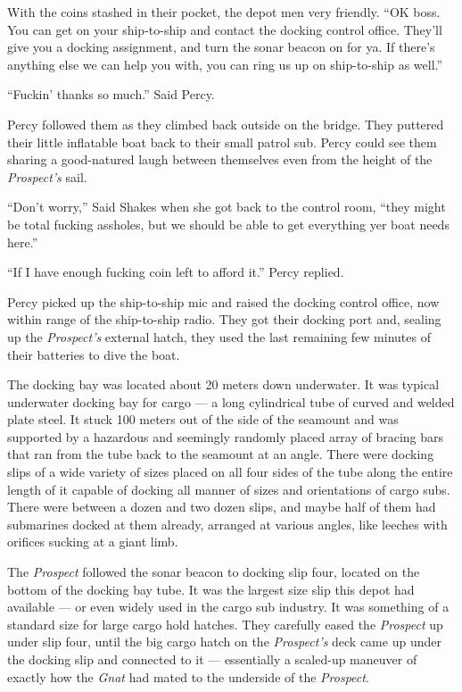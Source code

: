 \documentclass[
]{scrbook}
\begin{document}
With the coins stashed in their pocket, the depot men very friendly.
``OK boss. You can get on your ship-to-ship and contact the docking
control office. They'll give you a docking assignment, and turn the
sonar beacon on for ya. If there's anything else we can help you with,
you can ring us up on ship-to-ship as well.''

``Fuckin' thanks so much.'' Said Percy.

Percy followed them as they climbed back outside on the bridge. They
puttered their little inflatable boat back to their small patrol sub.
Percy could see them sharing a good-natured laugh between themselves
even from the height of the \emph{Prospect's} sail.

``Don't worry,'' Said Shakes when she got back to the control room,
``they might be total fucking assholes, but we should be able to get
everything yer boat needs here.''

``If I have enough fucking coin left to afford it.'' Percy replied.

Percy picked up the ship-to-ship mic and raised the docking control
office, now within range of the ship-to-ship radio. They got their
docking port and, sealing up the \emph{Prospect's} external hatch, they
used the last remaining few minutes of their batteries to dive the boat.

The docking bay was located about 20 meters down underwater. It was
typical underwater docking bay for cargo --- a long cylindrical tube of
curved and welded plate steel. It stuck 100 meters out of the side of
the seamount and was supported by a hazardous and seemingly randomly
placed array of bracing bars that ran from the tube back to the seamount
at an angle. There were docking slips of a wide variety of sizes placed
on all four sides of the tube along the entire length of it capable of
docking all manner of sizes and orientations of cargo subs. There were
between a dozen and two dozen slips, and maybe half of them had
submarines docked at them already, arranged at various angles, like
leeches with orifices sucking at a giant limb.

The \emph{Prospect} followed the sonar beacon to docking slip four,
located on the bottom of the docking bay tube. It was the largest size
slip this depot had available --- or even widely used in the cargo sub
industry. It was something of a standard size for large cargo hold
hatches. They carefully eased the \emph{Prospect} up under slip four,
until the big cargo hatch on the \emph{Prospect's} deck came up under
the docking slip and connected to it --- essentially a scaled-up
maneuver of exactly how the \emph{Gnat} had mated to the underside of
the \emph{Prospect}.
\end{document}
